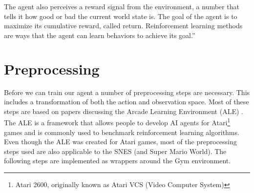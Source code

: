 \documentclass[11pt,a4paper]{article}
\begin{document}
The agent also perceives a reward signal from the environment, a number that tells it how good or bad the current world state is.
The goal of the agent is to maximize its cumulative reward, called return.
Reinforcement learning methods are ways that the agent can learn behaviors to achieve its goal.''

\section{Preprocessing}
Before we can train our agent a number of preprocessing steps are necessary.
This includes a transformation of both the action and observation space.
Most of these steps are based on papers discussing the Arcade Learning Environment (ALE) \cite{bellemare2013arcade,machado2018revisiting}.
The ALE is a framework that allows people to develop AI agents for Atari\footnote{Atari 2600, originally known as Atari VCS (Video Computer System)} games and is commonly used to benchmark reinforcement learning algorithms.
Even though the ALE was created for Atari games, most of the preprocessing steps used are also applicable to the SNES (and Super Mario World).
The following steps are implemented as wrappers around the Gym environment.
\end{document}
